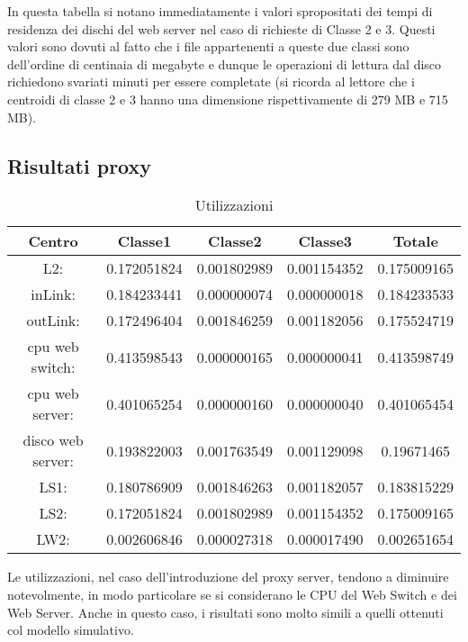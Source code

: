 In questa tabella si notano immediatamente i valori spropositati dei tempi di residenza dei dischi del web server nel caso di richieste di Classe 2 e 3. Questi valori sono dovuti al fatto che i file appartenenti a queste due classi sono dell'ordine di centinaia di megabyte e dunque le operazioni di lettura dal disco richiedono svariati minuti per essere completate (si ricorda al lettore che i centroidi di classe 2 e 3 hanno una dimensione rispettivamente di 279 MB e 715 MB).

\subsection{Risultati proxy}
\begin{table}[H]
\begin{center}
\begin{tabular}{||c|c|c|c|c||}
\hline
Centro &Classe1 &Classe2 &Classe3 &Totale\\
\hline
\hline
L2: &0.172051824 &0.001802989 &0.001154352 &0.175009165\\
\hline
inLink: &0.184233441 &0.000000074 &0.000000018 &0.184233533\\
\hline
outLink: &0.172496404 &0.001846259 &0.001182056 &0.175524719\\
\hline
cpu web switch: &0.413598543 &0.000000165 &0.000000041 &0.413598749\\
\hline
cpu web server: &0.401065254 &0.000000160 &0.000000040 &0.401065454\\
\hline
disco web server: &0.193822003 &0.001763549 &0.001129098 &0.19671465\\
\hline
LS1: &0.180786909 &0.001846263 &0.001182057 &0.183815229\\
\hline
LS2: &0.172051824 &0.001802989 &0.001154352 &0.175009165\\
\hline
LW2: &0.002606846 &0.000027318 &0.000017490 &0.002651654\\
\hline
\end{tabular}
\end{center}
\caption{Utilizzazioni}
\label{utilizzazioni}
\end{table}
Le utilizzazioni, nel caso dell'introduzione del proxy server, tendono a diminuire notevolmente, in modo particolare se si considerano le CPU del Web Switch e dei Web Server. Anche in questo caso, i risultati sono molto simili a quelli ottenuti col modello simulativo.

